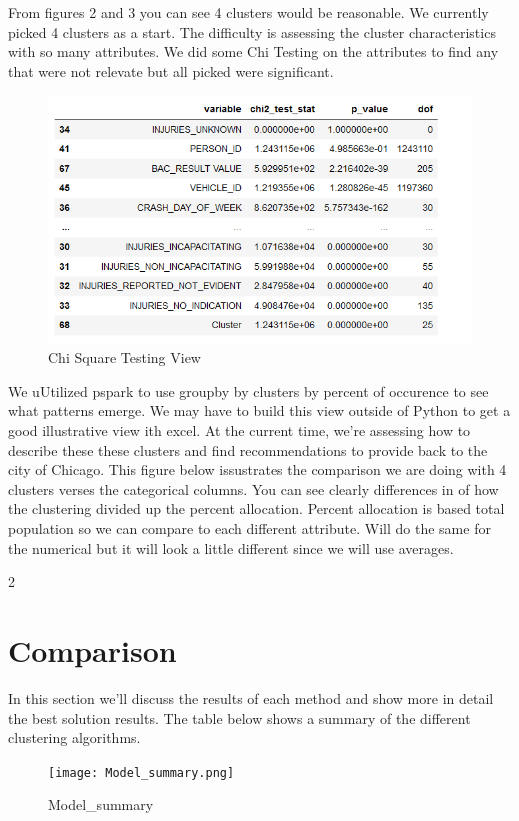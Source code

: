 \documentclass[conference]{IEEEtran}
\begin{document}
From figures 2 and 3 you can see 4 clusters would be reasonable.  We currently picked 4 clusters as a start. The difficulty is assessing the 
cluster characteristics with so many attributes.  We did some Chi Testing on the attributes to find any that were not relevate but all picked were significant.
\begin{figure}[!h]
	\includegraphics[width=\linewidth]{Chi Square.png}
	\caption{Chi Square Testing View}
	\label{table: Chi Square Testing View}
\end{figure}
We uUtilized pspark to use groupby by clusters by percent of occurence to see what patterns emerge.  We may have to build this view outside of Python to get a good illustrative view ith excel.  At the current time, we're assessing how to describe these these clusters and find recommendations to provide back to the city of Chicago. This figure below issustrates the comparison we are doing with 4 clusters verses the categorical columns.  You can see clearly differences in of how the clustering divided up the percent allocation. Percent allocation is based total population so we can compare to each different attribute.  Will do the same for the numerical but it will look a little different since we will use averages.

2

\section{Comparison}  
In this section we'll discuss the results of each method and show more in detail the best solution results.  The table below shows a summary of the different clustering algorithms.
\begin{figure}[!h]
	\texttt{[image: Model\_summary.png]}
	\caption{Model_summary }
	\label{fig: Model_summary}
\end{figure}
\end{document}
